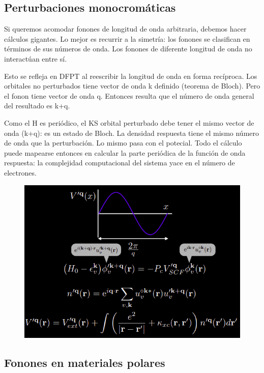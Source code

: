 \subsection{Perturbaciones monocromáticas}

  Si queremos acomodar fonones de longitud de onda arbitraria, debemos hacer cálculos gigantes. Lo mejor es recurrir a la simetría: los fonones se clasifican en términos de sus números de onda. Los fonones de diferente longitud de onda no interactúan entre sí.

  Esto se refleja en DFPT al reescribir la longitud de onda en forma recíproca. Los orbitales no perturbados tiene vector de onda k definido (teorema de Bloch). Pero el fonon tiene vector de onda q. Entonces resulta que el número de onda general del resultado es k+q.

  Como el H es periódico, el KS orbital perturbado debe tener el mismo vector de onda (k+q): es un estado de Bloch. La densidad respuesta tiene el mismo número de onda que la perturbación. Lo mismo pasa con el potecial. Todo el cálculo puede mapearse entonces en calcular la parte periódica de la función de onda respuesta: la complejidad computacional del sistema yace en el número de electrones.

  \begin{figure}[H]
    \centering
    \includegraphics[scale = 0.5]{figs/D5/monocrom.png}
  \end{figure}

\subsection{Fonones en materiales polares}

